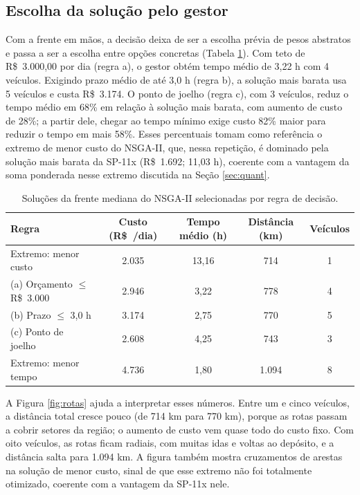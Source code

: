 \documentclass[a4paper,12pt]{article}
\begin{document}
\subsection{Escolha da solução pelo gestor}\label{sec:gestor}
\noindent Com a frente em mãos, a decisão deixa de ser a escolha prévia de pesos abstratos e passa a ser a escolha entre opções concretas (Tabela \ref{tab:gestor}). Com teto de R\$~3.000,00 por dia (regra a), o gestor obtém tempo médio de 3,22 h com 4 veículos. Exigindo prazo médio de até 3,0 h (regra b), a solução mais barata usa 5 veículos e custa R\$~3.174. O ponto de joelho (regra c), com 3 veículos, reduz o tempo médio em 68\% em relação à solução mais barata, com aumento de custo de 28\%; a partir dele, chegar ao tempo mínimo exige custo 82\% maior para reduzir o tempo em mais 58\%. Esses percentuais tomam como referência o extremo de menor custo do NSGA-II, que, nessa repetição, é dominado pela solução mais barata da SP-11x (R\$~1.692; 11,03 h), coerente com a vantagem da soma ponderada nesse extremo discutida na Seção \ref{sec:quant}.

\begin{table}[!htb]
  \centering
  \caption{Soluções da frente mediana do NSGA-II selecionadas por regra de decisão.}
  \label{tab:gestor}
  \small
  \begin{tabular}{lcccc}
    \toprule
    Regra & Custo (R\$~/dia) & Tempo médio (h) & Distância (km) & Veículos \\
    \midrule
    Extremo: menor custo & 2.035 & 13,16 & 714 & 1 \\
    (a) Orçamento $\le$ R\$~3.000 & 2.946 & 3,22 & 778 & 4 \\
    (b) Prazo $\le$ 3,0 h & 3.174 & 2,75 & 770 & 5 \\
    (c) Ponto de joelho & 2.608 & 4,25 & 743 & 3 \\
    Extremo: menor tempo & 4.736 & 1,80 & 1.094 & 8 \\
    \bottomrule
  \end{tabular}
\end{table}
A Figura \ref{fig:rotas} ajuda a interpretar esses números. Entre um e cinco veículos, a distância total cresce pouco (de 714 km para 770 km), porque as rotas passam a cobrir setores da região; o aumento de custo vem quase todo do custo fixo. Com oito veículos, as rotas ficam radiais, com muitas idas e voltas ao depósito, e a distância salta para 1.094 km. A figura também mostra cruzamentos de arestas na solução de menor custo, sinal de que esse extremo não foi totalmente otimizado, coerente com a vantagem da SP-11x nele.
\end{document}
